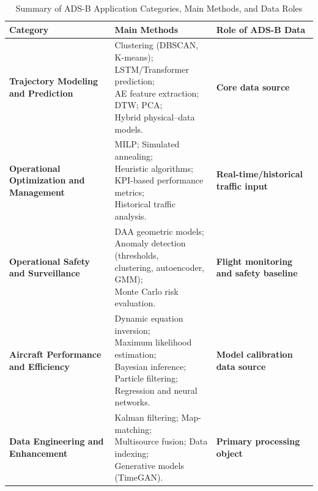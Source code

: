 \begin{table}[htbp]
	\centering
	\caption{Summary of ADS-B Application Categories, Main Methods, and Data Roles}
	\label{tb: 8categories}
	\renewcommand{\arraystretch}{1.15} %
	\setlength{\tabcolsep}{5pt} %
	\begin{tabular}{p{3.5cm} p{4.5cm} p{3.5cm}}
		\hline
		\textbf{Category} & \textbf{Main Methods} & \textbf{Role of ADS-B Data} \\
		\hline
		\textbf{Trajectory Modeling and Prediction} &
		\makecell[l]{Clustering (DBSCAN, K-means);\\
			LSTM/Transformer prediction;\\
			AE feature extraction; DTW; PCA;\\
			Hybrid physical–data models.} &
		\textbf{Core data source} \\
		\hline
		
		\textbf{Operational Optimization and Management} &
		\makecell[l]{
			MILP; Simulated annealing;\\
			Heuristic algorithms;\\
			KPI-based performance metrics;\\
			Historical traffic analysis.
		} &
		\textbf{Real-time/historical traffic input} \\
		\hline
		
		\textbf{Operational Safety and Surveillance} &
		\makecell[l]{
			DAA geometric models;\\
			Anomaly detection (thresholds,\\ clustering, autoencoder, GMM);\\
			Monte Carlo risk evaluation.
		} &
		\textbf{Flight monitoring and safety baseline} \\
		\hline
		
		\textbf{Aircraft Performance and Efficiency} &
		\makecell[l]{
			Dynamic equation inversion;\\
			Maximum likelihood estimation;\\
			Bayesian inference; Particle filtering;\\
			Regression and neural networks.
		} &
		\textbf{Model calibration data source} \\
		\hline
		
		\textbf{Data Engineering and Enhancement} &
		\makecell[l]{
			Kalman filtering; Map-matching;\\
			Multisource fusion; Data indexing;\\
			Generative models (TimeGAN).
		} &
		\textbf{Primary processing object} \\
		\hline
		

\end{tabular}
\end{table}

